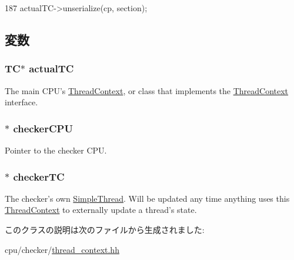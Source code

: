 \begin{DoxyCode}
187     { actualTC->unserialize(cp, section); }
\end{DoxyCode}


\subsection{変数}
\hypertarget{classCheckerThreadContext_af006a89ce9ad7b3b522cba1d69d950da}{
\subsubsection[{actualTC}]{\setlength{\rightskip}{0pt plus 5cm}TC$\ast$ {\bf actualTC}}}
\label{classCheckerThreadContext_af006a89ce9ad7b3b522cba1d69d950da}
The main CPU's \hyperlink{classThreadContext}{ThreadContext}, or class that implements the \hyperlink{classThreadContext}{ThreadContext} interface. \hypertarget{classCheckerThreadContext_af7c19dfd3eac49811831e9bc4323a60a}{
\subsubsection[{checkerCPU}]{$\ast$ {\bf checkerCPU}}}
\label{classCheckerThreadContext_af7c19dfd3eac49811831e9bc4323a60a}
Pointer to the checker CPU. \hypertarget{classCheckerThreadContext_ac3681193489e5a56c785bbac5564b9a5}{
\subsubsection[{checkerTC}]{$\ast$ {\bf checkerTC}}}
\label{classCheckerThreadContext_ac3681193489e5a56c785bbac5564b9a5}
The checker's own \hyperlink{classSimpleThread}{SimpleThread}. Will be updated any time anything uses this \hyperlink{classThreadContext}{ThreadContext} to externally update a thread's state. 

このクラスの説明は次のファイルから生成されました:\begin{DoxyCompactItemize}
\item 
cpu/checker/\hyperlink{checker_2thread__context_8hh}{thread\_\-context.hh}\end{DoxyCompactItemize}
